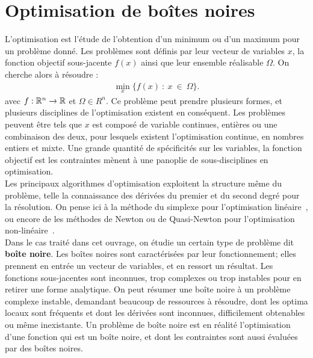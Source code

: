 \label{sec:Introduction}  %
\section{Optimisation de boîtes noires}\label{sec:bbo}
L'optimisation est l'étude de l'obtention d'un minimum ou d'un maximum pour un problème donné. Les problèmes sont définis par leur vecteur de variables $x$, la fonction objectif sous-jacente $f(x)$ ainsi que leur ensemble réalisable $\Omega$. On cherche alors à résoudre :
\begin{gather}
\underset{x}{\min}\{f(x)\ :\ x\ \in\ \Omega\}.
\end{gather}
avec $f : \mathbb{R} ^n \rightarrow \mathbb{R}$ et $\Omega \in R^n$. Ce problème peut prendre plusieurs formes, et plusieurs disciplines de l'optimisation existent en conséquent. Les problèmes peuvent être tels que $x$ est composé de variable continues, entières ou une combinaison des deux, pour lesquels existent l'optimisation continue, en nombres entiers et mixte. Une grande quantité de spécificités sur les variables, la fonction objectif est les contraintes mènent à une panoplie de sous-disciplines en optimisation.\\
Les principaux algorithmes d'optimisation exploitent la structure même du problème, telle la connaissance des dérivées du premier et du second degré pour la résolution. On pense ici à la méthode du simplexe pour l'optimisation linéaire~\cite{NaSo96a}, ou encore de les méthodes de Newton ou de Quasi-Newton pour l'optimisation non-linéaire~\cite{NoWr99a}.\\
Dans le cas traité dans cet ouvrage, on étudie un certain type de problème dit \textbf{boîte noire}. Les boîtes noires sont caractérisées par leur fonctionnement; elles prennent en entrée un vecteur de variables, et en ressort un résultat. Les fonctions sous-jacentes sont inconnues, trop complexes ou trop instables pour en retirer une forme analytique. On peut résumer une boîte noire à un problème complexe instable, demandant beaucoup de ressources à résoudre, dont les optima locaux sont fréquents et dont les dérivées sont inconnues, difficilement obtenables ou même inexistante. Un problème de boîte noire est en réalité l'optimisation d'une fonction qui est un boîte noire, et dont les contraintes sont aussi évaluées par des boîtes noires.\\
